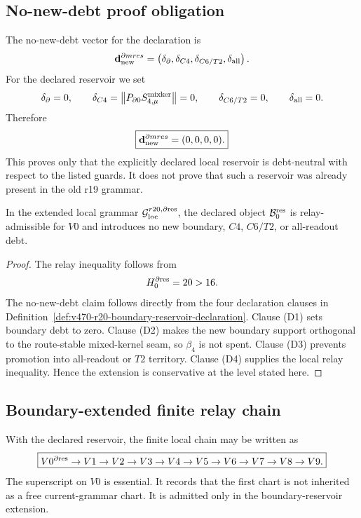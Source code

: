 \subsection{No-new-debt proof obligation}
\label{subsec:v470-r20-no-new-debt-proof-obligation}

The no-new-debt vector for the declaration is
\[
\mathbf d_{\rm new}^{\partial{
m res}}
=
\left(
\delta_{\partial},
\delta_{C4},
\delta_{C6/T2},
\delta_{\rm all}
\right).
\]
For the declared reservoir we set
\[
\delta_{\partial}=0,
\qquad
\delta_{C4}=\left\|P_{\partial0}S_{4,\mu}^{\rm mixker}\right\|=0,
\qquad
\delta_{C6/T2}=0,
\qquad
\delta_{\rm all}=0.
\]
Therefore
\[
\boxed{
\mathbf d_{\rm new}^{\partial{
m res}}=(0,0,0,0).
}
\]
This proves only that the explicitly declared local reservoir is debt-neutral
with respect to the listed guards.  It does not prove that such a reservoir was
already present in the old r19 grammar.

\begin{proposition}
\label{prop:v470-r20-no-new-debt-declaration-pass}
In the extended local grammar \(\mathcal G_{\rm loc}^{r20,\partial{\rm res}}\),
the declared object \(\mathcal B_0^{\rm res}\) is relay-admissible for \(V0\)
and introduces no new boundary, \(C4\), \(C6/T2\), or all-readout debt.
\end{proposition}

\begin{proof}
The relay inequality follows from
\[
H_0^{\partial{\rm res}}
=20>16.
\]
The no-new-debt claim follows directly from the four declaration clauses in
Definition~\ref{def:v470-r20-boundary-reservoir-declaration}.  Clause (D1)
sets boundary debt to zero.  Clause (D2) makes the new boundary support
orthogonal to the route-stable mixed-kernel seam, so \(\beta_4\) is not spent.
Clause (D3) prevents promotion into all-readout or \(T2\) territory.  Clause
(D4) supplies the local relay inequality.  Hence the extension is conservative
at the level stated here.
\end{proof}

\subsection{Boundary-extended finite relay chain}
\label{subsec:v470-r20-boundary-extended-finite-relay-chain}

With the declared reservoir, the finite local chain may be written as
\[
\boxed{
V0^{\partial{\rm res}}
\to
V1\to V2\to V3\to V4\to V5\to V6\to V7\to V8\to V9.
}
\]
The superscript on \(V0\) is essential.  It records that the first chart is
not inherited as a free current-grammar chart.  It is admitted only in the
boundary-reservoir extension.


